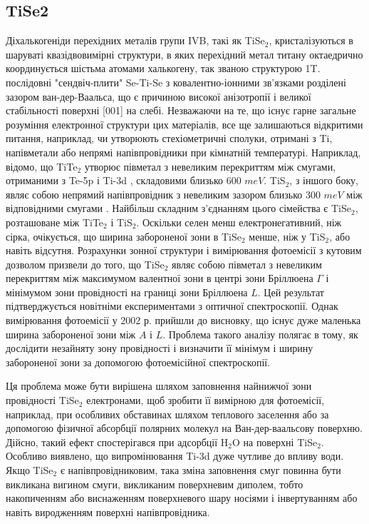 \subsection{TiSe2}
Діхалькогеніди перехідних металів групи IVB, такі як TiSe$_2$, кристалізуються в шаруваті квазідвовимірні структури, в яких перехідний метал титану октаедрично координується шістьма атомами халькогену, так званою структурою 1T. послідовні "сендвіч-плити" Se-Ti-Se з ковалентно-іонними зв'язками розділені зазором ван-дер-Ваальса, що є причиною високої анізотропії і великої стабільності поверхні [001] на слебі. Незважаючи на те, що існує гарне загальне розуміння електронної структури цих матеріалів, все ще залишаються відкритими питання, наприклад, чи утворюють стехіометричні сполуки, отримані з Ti, напівметали або непрямі напівпровідники при кімнатній температурі. Наприклад, відомо, що TiTe$_2$ утворює півметал з невеликим перекриттям між смугами, отриманими з Te-5p і Ti-3d \cite{PhysRevB29, PhysRevB54}, складовими близько 600 $meV$. TiS$_2$, з іншого боку, являє собою непрямий напівпровідник з невеликим зазором близько 300 $meV$ між відповідними смугами \cite{PhysRevB16, PhysRevB21}. Найбільш складним з'єднанням цього сімейства є TiSe$_2$, розташоване між TiTe$_2$ і TiS$_2$. Оскільки селен менш електронегативний, ніж сірка, очікується, що ширина забороненої зони в TiSe$_2$ менше, ніж у TiS$_2$, або навіть відсутня. Розрахунки зонної структури і вимірювання фотоемісії з кутовим дозволом \cite{PhysRevB17,PhysRevL55,SolidStateCommun53,PhysRevB61} призвели до того, що TiSe$_2$ являє собою півметал з невеликим перекриттям між максимумом валентної зони в центрі зони Бріллюена $\Gamma$ і мінімумом зони провідності на границі зони Бріллюена $L$. Цей результат підтверджується новітніми експериментами з оптичної спектроскопії. Однак вимірювання фотоемісії у 2002 р. \cite{PhysRev65,PhyRevLet88} прийшли до висновку, що існує дуже маленька ширина забороненої зони між $A$ і $L$. Проблема такого аналізу полягає в тому, як дослідити незайняту зону провідності і визначити її мінімум і ширину забороненої зони за допомогою фотоемісійної спектроскопії.

Ця проблема може бути вирішена шляхом заповнення найнижчої зони провідності TiSe$_2$ електронами, щоб зробити її вимірною для фотоемісії, наприклад, при особливих обставинах шляхом теплового заселення або за допомогою фізичної абсорбції полярних молекул на Ван-дер-ваальсову поверхню. Дійсно, такий ефект спостерігався при адсорбції H$_2$O на поверхні TiSe$_2$. Особливо виявлено, що випромінювання Ti-3d дуже чутливе до впливу води. Якщо TiSe$_2$ є напівпровідниковим, така зміна заповнення смуг повинна бути викликана вигином смуги, викликаним поверхневим диполем, тобто накопиченням або виснаженням поверхневого шару носіями і інвертуванням або навіть виродженням поверхні напівпровідника.
